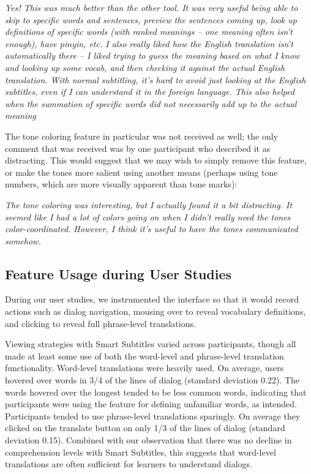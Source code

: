 \documentclass{sigchi}
\begin{document}
\emph{Yes! This was much better than the other tool. It was very useful being able to skip to specific words and sentences, preview the sentences coming up, look up definitions of specific words (with ranked meanings – one meaning often isn't enough), have pinyin, etc. I also really liked how the English translation isn't automatically there – I liked trying to guess the meaning based on what I know and looking up some vocab, and then checking it against the actual English translation. With normal subtitling, it's hard to avoid just looking at the English subtitles, even if I can understand it in the foreign language. This also helped when the summation of specific words did not necessarily add up to the actual meaning}

The tone coloring feature in particular was not received as well; the only comment that was received was by one participant who described it as distracting. This would suggest that we may wish to simply remove this feature, or make the tones more salient using another means (perhaps using tone numbers, which are more visually apparent than tone marks):
	 	 	
\emph{The tone coloring was interesting, but I actually found it a bit distracting. It seemed like I had a lot of colors going on when I didn't really need the tones color-coordinated. However, I think it's useful to have the tones communicated somehow.}

\subsection{Feature Usage during User Studies}

During our user studies, we instrumented the interface so that it would record actions such as dialog navigation, mousing over to reveal vocabulary definitions, and clicking to reveal full phrase-level translations.

Viewing strategies with Smart Subtitles varied across
participants, though all made at least some use of both
the word-level and phrase-level translation functionality.
Word-level translations were heavily used. On average,
users hovered over words in 3/4 of the lines of dialog
(standard deviation 0.22).
The words hovered over the longest tended to be less
common words, indicating that participants were using
the feature for defining unfamiliar words, as intended.
Participants tended to use phrase-level translations
sparingly. On average they clicked on the translate
button on only 1/3 of the lines of dialog
(standard deviation 0.15).
Combined with our observation that there was no decline in
comprehension levels with Smart Subtitles, this suggests
that word-level translations are often sufficient for
learners to understand dialogs.
\end{document}
